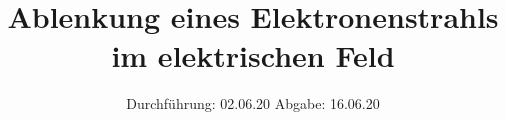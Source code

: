 

\subject{V501}
\title{Ablenkung eines Elektronenstrahls im elektrischen Feld}
\date{%
  Durchführung: 02.06.20
  \hspace{3em}
  Abgabe: 16.06.20
}



\maketitle
\thispagestyle{empty}
\tableofcontents
\newpage







\printbibliography{}


